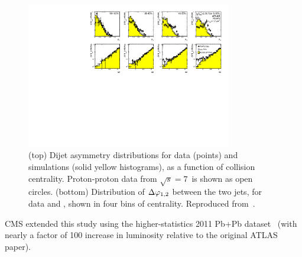 \begin{figure}[!thb]
\begin{center}
\includegraphics[width=0.8\textwidth]{jetfigures/final_4x2_23_newpp.pdf}
\caption{
(top) Dijet asymmetry distributions for data (points) and {} 
simulations (solid yellow histograms), as a function of collision centrality.  
Proton-proton data from $\sqrt{s}=7$\TeV\ is shown as open circles.
(bottom) Distribution of $\Delta\varphi_{1,2}$ between the two jets, 
for data and {}, shown in four bins of centrality.
Reproduced from~\cite{Aad:2010bu}.
}
\label{fig:pas:final_4x2}
\end{center}
\end{figure}

CMS extended this study using the higher-statistics 2011 Pb+Pb dataset~\cite{CMS_dijet} 
(with nearly a
factor of 100 increase in luminosity relative to the original ATLAS paper).

